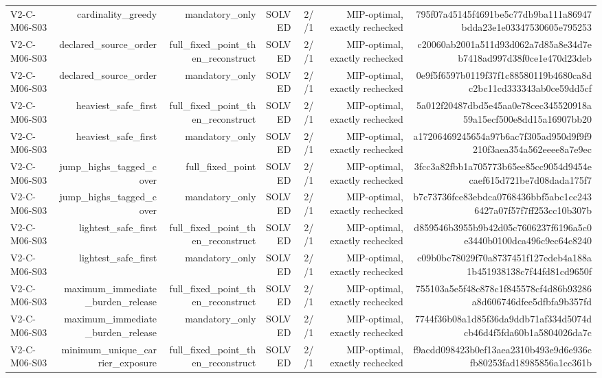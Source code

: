 {\begin{longtable}{lrrrrrr}
V2-C-M06-S03 & cardinality\_greedy & mandatory\_only & SOLVED & 2//1 & MIP-optimal, exactly rechecked & 795f07a45145f4691be5c77db9ba111a86947bdda23e1e03347530605e795253 \\
V2-C-M06-S03 & declared\_source\_order & full\_fixed\_point\_then\_reconstruct & SOLVED & 2//1 & MIP-optimal, exactly rechecked & c20060ab2001a511d93d062a7d85a8e34d7eb7418ad997d38f0ce1e470d23deb \\
V2-C-M06-S03 & declared\_source\_order & mandatory\_only & SOLVED & 2//1 & MIP-optimal, exactly rechecked & 0e9f5f6597b0119f37f1c88580119b4680ca8dc2bc11cd333343ab0ce59dd5cf \\
V2-C-M06-S03 & heaviest\_safe\_first & full\_fixed\_point\_then\_reconstruct & SOLVED & 2//1 & MIP-optimal, exactly rechecked & 5a012f20487dbd5e45aa0e78cec345520918a59a15ecf500e8dd15a16907bb20 \\
V2-C-M06-S03 & heaviest\_safe\_first & mandatory\_only & SOLVED & 2//1 & MIP-optimal, exactly rechecked & a17206469245654a97b6ac7f305ad950d9f9f9210f3aea354a562eeee8a7e9ec \\
V2-C-M06-S03 & jump\_highs\_tagged\_cover & full\_fixed\_point & SOLVED & 2//1 & MIP-optimal, exactly rechecked & 3fcc3a82fbb1a705773b65ee85cc9054d9454ecaef615d721be7d08dada175f7 \\
V2-C-M06-S03 & jump\_highs\_tagged\_cover & mandatory\_only & SOLVED & 2//1 & MIP-optimal, exactly rechecked & b7c73736fce83ebdca0768436bbf5abc1cc2436427a07f57f7ff253cc10b307b \\
V2-C-M06-S03 & lightest\_safe\_first & full\_fixed\_point\_then\_reconstruct & SOLVED & 2//1 & MIP-optimal, exactly rechecked & d859546b3955b9b42d05c7606237f6196a5c0e3440b0100dca496c9ec64c8240 \\
V2-C-M06-S03 & lightest\_safe\_first & mandatory\_only & SOLVED & 2//1 & MIP-optimal, exactly rechecked & c09b0bc78029f70a8737451f127edeb4a188a1b451938138c7f44fd81cd9650f \\
V2-C-M06-S03 & maximum\_immediate\_burden\_release & full\_fixed\_point\_then\_reconstruct & SOLVED & 2//1 & MIP-optimal, exactly rechecked & 755103a5e5f48c878c1f845578cf4d86b93286a8d606746dfee5dfbfa9b357fd \\
V2-C-M06-S03 & maximum\_immediate\_burden\_release & mandatory\_only & SOLVED & 2//1 & MIP-optimal, exactly rechecked & 7744f36b08a1d85f36da9ddb71af334d5074dcb46d4f5fda60b1a5804026da7c \\
V2-C-M06-S03 & minimum\_unique\_carrier\_exposure & full\_fixed\_point\_then\_reconstruct & SOLVED & 2//1 & MIP-optimal, exactly rechecked & f9acdd098423b0ef13aea2310b493e9d6e936cfb80253fad18985856a1cc361b \\

\end{longtable}}

